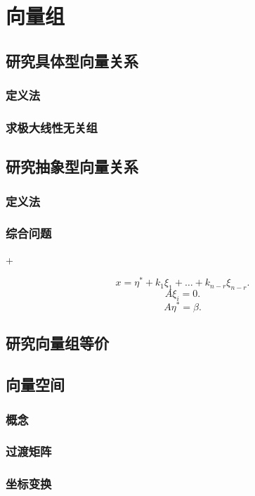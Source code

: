 \chapter{向量组}

\section{研究具体型向量关系}

\subsection{定义法}
\subsection{求极大线性无关组}
\section{研究抽象型向量关系}
\subsection{定义法}
\subsection{综合问题}
\DOne+\DTwoThree

$$x = \eta^{*} + k_{1} \xi_{1} + \ldots + k_{n-r} \xi_{n-r}.$$
$$
A \xi_{i} = 0.
$$
$$A \eta^{*} = \beta.$$
\section{研究向量组等价}
\section{向量空间}
\subsection{概念}
\subsection{过渡矩阵}
\subsection{坐标变换}